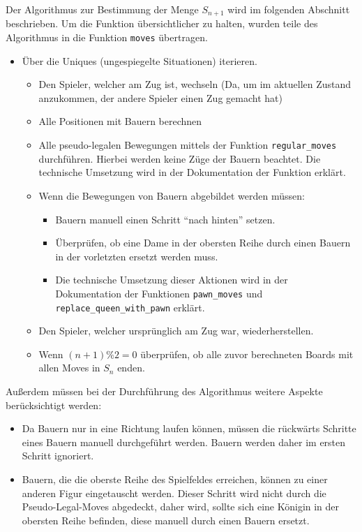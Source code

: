 \documentclass[a4paper,12pt]{article}
\providecommand{\tightlist}{%
      \setlength{\itemsep}{0pt}\setlength{\parskip}{0pt}}
\begin{document}
Der Algorithmus zur Bestimmung der Menge \(S_{n+1}\) wird im folgenden
Abschnitt beschrieben. Um die Funktion übersichtlicher zu halten, wurden
teile des Algorithmus in die Funktion \texttt{moves} übertragen.

\begin{itemize}
\tightlist
\item
  Über die Uniques (ungespiegelte Situationen) iterieren.

  \begin{itemize}
  \tightlist
  \item
    Den Spieler, welcher am Zug ist, wechseln (Da, um im aktuellen
    Zustand anzukommen, der andere Spieler einen Zug gemacht hat)
  \item
    Alle Positionen mit Bauern berechnen
  \item
    Alle pseudo-legalen Bewegungen mittels der Funktion
    \texttt{regular\_moves} durchführen. Hierbei werden keine Züge der
    Bauern beachtet. Die technische Umsetzung wird in der Dokumentation
    der Funktion erklärt.
  \item
    Wenn die Bewegungen von Bauern abgebildet werden müssen:

    \begin{itemize}
    \tightlist
    \item
      Bauern manuell einen Schritt ``nach hinten'' setzen.
    \item
      Überprüfen, ob eine Dame in der obersten Reihe durch einen Bauern
      in der vorletzten ersetzt werden muss.
    \item
      Die technische Umsetzung dieser Aktionen wird in der Dokumentation
      der Funktionen \texttt{pawn\_moves} und
      \texttt{replace\_queen\_with\_pawn} erklärt.
    \end{itemize}
  \item
    Den Spieler, welcher ursprünglich am Zug war, wiederherstellen.
  \item
    Wenn \((n+1) \% 2 = 0\) überprüfen, ob alle zuvor berechneten Boards
    mit allen Moves in \(S_n\) enden.
  \end{itemize}
\end{itemize}

Außerdem müssen bei der Durchführung des Algorithmus weitere Aspekte
berücksichtigt werden:

\begin{itemize}
\tightlist
\item
  Da Bauern nur in eine Richtung laufen können, müssen die rückwärts
  Schritte eines Bauern manuell durchgeführt werden. Bauern werden daher
  im ersten Schritt ignoriert.
\item
  Bauern, die die oberste Reihe des Spielfeldes erreichen, können zu
  einer anderen Figur eingetauscht werden. Dieser Schritt wird nicht
  durch die Pseudo-Legal-Moves abgedeckt, daher wird, sollte sich eine
  Königin in der obersten Reihe befinden, diese manuell durch einen
  Bauern ersetzt.
\end{itemize}
\end{document}
